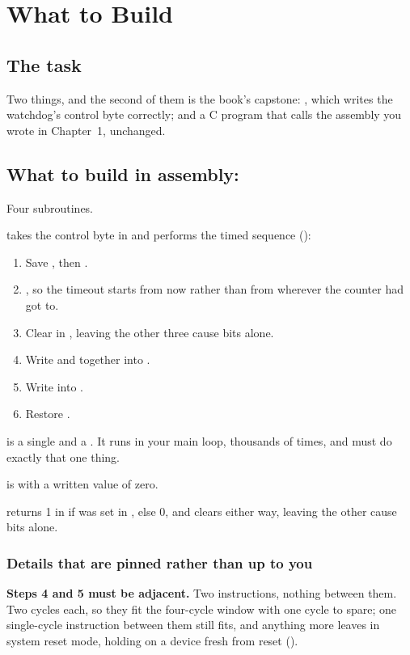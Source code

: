 
\section{What to Build}
\label{c6:sec:build}

\subsection{The task}
\label{c6:sec:task}
Two things, and the second of them is the book's capstone: ,
which writes the watchdog's control byte correctly; and a C program that calls the assembly you
wrote in Chapter~1, unchanged.

\subsection{What to build in assembly: }
\label{c6:sec:driver}
Four subroutines.

\textbf{} takes the control byte in  and performs the timed sequence
():
\begin{enumerate}
  \item Save , then .
  \item {}, so the timeout starts from now rather than from wherever the counter had got to.
  \item Clear  in , leaving the other three cause bits alone.
  \item Write  and  together into .
  \item Write  into .
  \item Restore .
\end{enumerate}

\textbf{} is a single  and a . It runs in your main loop,
thousands of times, and must do exactly that one thing.

\textbf{} is  with a written value of zero.

\textbf{} returns 1 in  if  was set in
, else 0, and clears  either way, leaving the other cause bits alone.

\subsubsection{Details that are pinned rather than up to you}
\textbf{Steps 4 and 5 must be adjacent.} Two  instructions, nothing between them. Two
cycles each, so they fit the four-cycle window with one cycle to spare; one single-cycle
instruction between them still fits, and anything more leaves  in system reset mode,
holding  on a device fresh from reset ().

